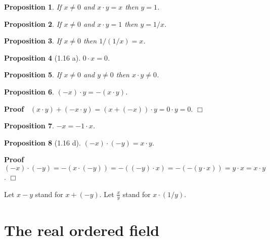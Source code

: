 \documentclass{article}
\newenvironment{forthel}{\begin{leftbar}}{\end{leftbar}}
\newenvironment{proof}{\noindent\textbf{Proof\ }}{\hspace*{\fill}$\Box$\medskip}
\newtheorem{proposition}{Proposition}
\begin{document}
\begin{forthel}
\begin{proposition} If $x \neq 0$ and $x \cdot y = x$ then $y = 1$.
\end{proposition}
\begin{proposition} If $x \neq 0$ and $x \cdot y = 1$ then $y = 1/x$.
\end{proposition}

\begin{proposition} If $x \neq 0$ then $1/(1/x) = x$.
\end{proposition}
\begin{proposition}[1.16 a] $0 \cdot x = 0$. \end{proposition}
\begin{proposition} If $x \neq 0$ and $y \neq 0$ then $x \cdot y \neq 0$.
\end{proposition}
\begin{proposition} $(-x) \cdot y = -(x \cdot y)$. \end{proposition}
\begin{proof} $(x \cdot y) + (-x \cdot y) = (x + (-x)) \cdot y 
= 0 \cdot y = 0$.
\end{proof}

\begin{proposition} $-x = -1 \cdot x$. \end{proposition}

\begin{proposition}[1.16 d] $(-x) \cdot (-y) = x \cdot y$.
\end{proposition}
\begin{proof} $(-x)\cdot (-y)=-(x\cdot(-y))=-((-y)\cdot x)=
-(-(y\cdot x))=y\cdot x=x\cdot y$. 
\end{proof}

Let $x - y$ stand for $x + (-y)$.
Let $\frac{x}{y}$ stand for $x \cdot (1/y)$.

\end{forthel}

\section{The real ordered field}
\end{document}
